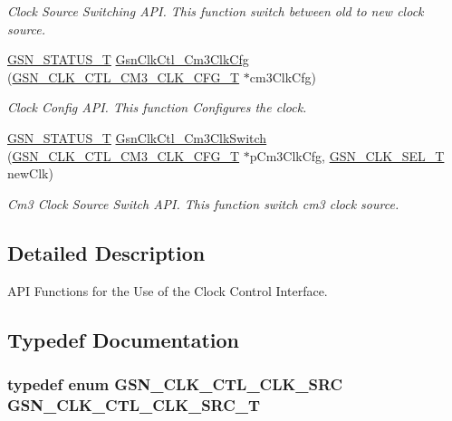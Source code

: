 \begin{DoxyCompactItemize}
\begin{DoxyCompactList}\small\item\em Clock Source Switching API. This function switch between old to new clock source. \end{DoxyCompactList}\item 
\hyperlink{a00659_gae36517c0f5872426a7034c9551eb96ac}{GSN\_\-STATUS\_\-T} \hyperlink{a00644_gab47a206ddcbe7020c38010d7b073d7db}{GsnClkCtl\_\-Cm3ClkCfg} (\hyperlink{a00038}{GSN\_\-CLK\_\-CTL\_\-CM3\_\-CLK\_\-CFG\_\-T} $\ast$cm3ClkCfg)
\begin{DoxyCompactList}\small\item\em Clock Config API. This function Configures the clock. \end{DoxyCompactList}\item 
\hyperlink{a00659_gae36517c0f5872426a7034c9551eb96ac}{GSN\_\-STATUS\_\-T} \hyperlink{a00644_ga6198c49f77d396e7cbfe138fa1315674}{GsnClkCtl\_\-Cm3ClkSwitch} (\hyperlink{a00038}{GSN\_\-CLK\_\-CTL\_\-CM3\_\-CLK\_\-CFG\_\-T} $\ast$pCm3ClkCfg, \hyperlink{a00644_gaf4925c33b2dac850008f7d4463760580}{GSN\_\-CLK\_\-SEL\_\-T} newClk)
\begin{DoxyCompactList}\small\item\em Cm3 Clock Source Switch API. This function switch cm3 clock source. \end{DoxyCompactList}\end{DoxyCompactItemize}


\subsection{Detailed Description}
API Functions for the Use of the Clock Control Interface. 

\subsection{Typedef Documentation}
\hypertarget{a00644_ga95d23078ba56d33653b82794ca56f5d6}{
\subsubsection[{GSN\_\-CLK\_\-CTL\_\-CLK\_\-SRC\_\-T}]{\setlength{\rightskip}{0pt plus 5cm}typedef enum {\bf GSN\_\-CLK\_\-CTL\_\-CLK\_\-SRC} {\bf GSN\_\-CLK\_\-CTL\_\-CLK\_\-SRC\_\-T}}}
\label{a00644_ga95d23078ba56d33653b82794ca56f5d6}


